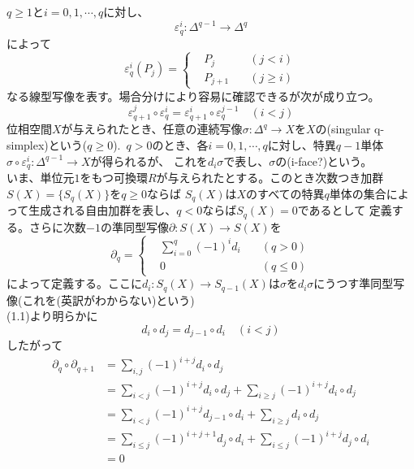 \documentclass[dvipdfmx,a4paper,11pt]{jsarticle}
\begin{document}
$q\geq 1$と$i=0,1,\cdots,q$に対し、
\begin{equation*}
  \varepsilon^{i}_{q}:\Delta^{q-1}\to \Delta^{q}
\end{equation*}
によって
\begin{equation*}
  \varepsilon^{i}_{q}(P_{j})=\left\{
    \begin{alignedat}{2}
      &P_{j}\quad &(j<i)\\
      &P_{j+1}\quad &(j\geq i)
    \end{alignedat}
  \right.
\end{equation*}
なる線型写像を表す。場合分けにより容易に確認できるが次が成り立つ。
\begin{equation}
  \varepsilon^{j}_{q+1} \circ \varepsilon^{i}_{q}=\varepsilon^{i}_{q+1}\circ \varepsilon^{j-1}_{q}\quad (i<j)
\end{equation}
位相空間$X$が与えられたとき、任意の連続写像$\sigma : \Delta^{q}\to X$を$X$の(singular q-simplex)という($q\geq 0$).\ 
$q>0$のとき、各$i=0,1,\cdots,q$に対し、特異$q-1$単体$\sigma \circ \varepsilon^{i}_{q} : \Delta^{q-1}\to X$が得られるが、
これを$d_{i}\sigma$で表し、$\sigma$の\textgt{第$i$面}(i-face?)という。\\
いま、単位元$1$をもつ可換環$R$が与えられたとする。このとき次数つき加群$S(X)=\{S_{q}(X)\}$を$q\geq 0$ならば
$S_{q}(X)$は$X$のすべての特異$q$単体の集合によって生成される自由加群を表し、$q<0$ならば$S_{q}(X)=0$であるとして
定義する。さらに次数$-1$の準同型写像$\partial : S(X)\to S(X)$を
\begin{equation*}
  \partial_{q}=\left\{
  \begin{alignedat}{2}
    &\sum_{i=0}^{q}(-1)^{i}d_{i}\quad &(q>0)\\
    &0 \quad &(q\leq 0)
  \end{alignedat}
  \right.
\end{equation*}
によって定義する。ここに$d_{i}:S_{q}(X)\to S_{q-1}(X)$は$\sigma$を$d_{i}\sigma$にうつす準同型写像(これを(英訳がわからない)という)\\
(1.1)より明らかに
\begin{equation}
  d_{i}\circ d_{j}=d_{j-1}\circ d_{i}\quad (i<j)
\end{equation}
したがって
\begin{align*}
  \partial_{q}\circ \partial_{q+1}
  &=\sum_{i,j}(-1)^{i+j}d_{i}\circ d_{j}\\
  &=\sum_{i<j}(-1)^{i+j}d_{i}\circ d_{j} + \sum_{i\geq j}(-1)^{i+j}d_{i}\circ d_{j}\\
  &=\sum_{i<j}(-1)^{i+j}d_{j-1}\circ d_{i} + \sum_{i\geq j}d_{i}\circ d_{j}\\
  &=\sum_{i\leq j}(-1)^{i+j+1}d_{j}\circ d_{i} + \sum_{i\leq j}(-1)^{i+j}d_{j}\circ d_{i}\\
  &=0
\end{align*}
\end{document}
